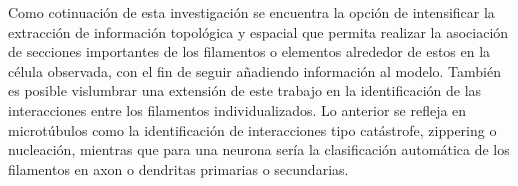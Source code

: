Como cotinuaci\'on de esta investigaci\'on se encuentra la opci\'on de intensificar la extracci\'on de informaci\'on topol\'ogica y espacial que permita realizar la asociaci\'on de secciones importantes de los filamentos o elementos alrededor de estos en la c\'elula observada, con el fin de seguir a\~nadiendo informaci\'on al modelo. Tambi\'en es posible vislumbrar una extensi\'on de este trabajo en la identificaci\'on de las interacciones entre los filamentos individualizados. Lo anterior se refleja en microt\'ubulos como la identificaci\'on de interacciones tipo cat\'astrofe, zippering o nucleaci\'on, mientras que para una neurona ser\'ia la clasificaci\'on autom\'atica de los filamentos en axon o dendritas primarias o secundarias.